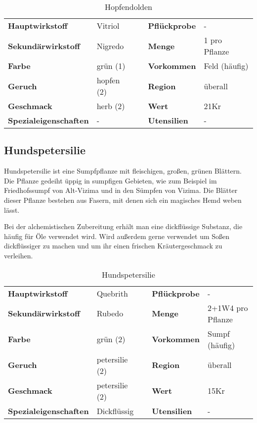 \begin{table}[H] 
\begin{center} 
\begin{tabular}{|l|l|p{1cm}|l|l|} 
  	\cline{1-2} \cline{4-5} 
  	\textbf{Hauptwirkstoff} & Vitriol && \textbf{Pflückprobe} & - \\ \cline{1-2} \cline{4-5} 
  	\textbf{Sekundärwirkstoff} & Nigredo && \textbf{Menge} & 1 pro Pflanze \\ \cline{1-2} \cline{4-5} 
  	\textbf{Farbe} & grün (1) && \textbf{Vorkommen} & Feld (häufig) \\ \cline{1-2} \cline{4-5} 
  	\textbf{Geruch} & hopfen (2) && \textbf{Region} & überall \\ \cline{1-2} \cline{4-5} 
  	\textbf{Geschmack} & herb (2) && \textbf{Wert} & 21Kr \\ \cline{1-2} \cline{4-5} 
  	\textbf{Spezialeigenschaften} & - && \textbf{Utensilien} & - \\ \cline{1-2} \cline{4-5} 
\end{tabular} 
\end{center} 
\caption{Hopfendolden} 
\label{tab:hopfendolden} 
\end{table}


\subsection{Hundspetersilie}
Hundspetersilie ist eine Sumpfpflanze mit fleischigen, großen, grünen Blättern. Die Pflanze gedeiht üppig in sumpfigen Gebieten, wie zum Beispiel im Friedhofssumpf von Alt-Vizima und in den Sümpfen von Vizima. Die Blätter dieser Pflanze bestehen aus Fasern, mit denen sich ein magisches Hemd weben lässt. 

Bei der alchemistischen Zubereitung erhält man eine dickflüssige Substanz, die häufig für Öle verwendet wird. Wird außerdem gerne verwendet um Soßen dickflüssiger zu machen und um ihr einen frischen Kräutergeschmack zu verleihen.

\begin{table}[H] 
\begin{center} 
\begin{tabular}{|l|l|p{1cm}|l|l|} 
  	\cline{1-2} \cline{4-5} 
  	\textbf{Hauptwirkstoff} & Quebrith && \textbf{Pflückprobe} & - \\ \cline{1-2} \cline{4-5} 
  	\textbf{Sekundärwirkstoff} & Rubedo && \textbf{Menge} & 2+1W4 pro Pflanze \\ \cline{1-2} \cline{4-5} 
  	\textbf{Farbe} & grün (2) && \textbf{Vorkommen} & Sumpf (häufig) \\ \cline{1-2} \cline{4-5} 
  	\textbf{Geruch} & petersilie (2) && \textbf{Region} & überall \\ \cline{1-2} \cline{4-5} 
  	\textbf{Geschmack} & petersilie (2) && \textbf{Wert} & 15Kr \\ \cline{1-2} \cline{4-5} 
  	\textbf{Spezialeigenschaften} & Dickflüssig && \textbf{Utensilien} & - \\ \cline{1-2} \cline{4-5} 
\end{tabular} 
\end{center} 
\caption{Hundspetersilie} 
\label{tab:hundspetersilie} 
\end{table}

